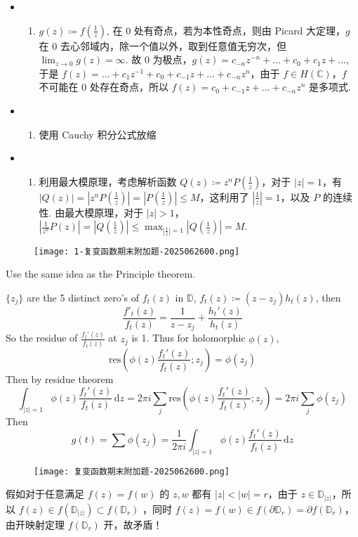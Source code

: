 \begin{itemize}
	\item 	\begin{enumerate}
		\item $g(z)\coloneqq f\left( \frac{1}{z} \right)$, 在 0 处有奇点，若为本性奇点，则由 Picard 大定理，$g$ 在 0 去心邻域内，除一个值以外，取到任意值无穷次，但 $\lim_{ z \to 0}g(z)=\infty$. 故 0 为极点，$g(z)=c_{-n}z^{-n}+\dots+c_0+c_1z+\dots$, 于是 $f(z)=\dots+c_1z^{-1}+c_0+c_{-1}z+\dots+c_{-n}z^{n}$，由于 $f\in H(\mathbb{C})$，$f$ 不可能在 0 处存在奇点，所以 $f(z)=c_0+c_{-1}z+\dots+c_{-n}z^{n}$ 是多项式.
	\end{enumerate}
	\item 	\begin{enumerate}
		\item 使用 Cauchy 积分公式放缩
	\end{enumerate}
	\item 	\begin{enumerate}
		\item 利用最大模原理，考虑解析函数 $Q (z)\coloneqq z^{n}P\left( \frac{1}{z} \right)$，对于 $\lvert z \rvert=1$，有 $\lvert Q(z) \rvert=\left\lvert  z^{n}P\left( \frac{1}{z} \right)  \right\rvert=\left\lvert  P\left( \frac{1}{z} \right)  \right\rvert\leq M$，这利用了 $\left\lvert  \frac{1}{z}  \right\rvert=1$，以及 $P$ 的连续性. 由最大模原理，对于 $\lvert z \rvert>1$，$\left\lvert  \frac{1}{z^{n}}P(z)  \right\rvert=\left\lvert  Q\left( \frac{1}{z} \right)  \right\rvert\leq \max_{\left\lvert  \frac{1}{z}  \right\rvert=1}\left\lvert  Q\left( \frac{1}{z} \right)  \right\rvert=M$.
	\end{enumerate}
\end{itemize}

\begin{figure}[H]
\centering
\texttt{[image: 1-复变函数期末附加题-2025062600.png]}
\label{}
\end{figure}

Use the same idea as the Principle theorem.

$\{ z_j \}$ are the 5 distinct zero's of $f_{t}(z)$ in $\mathbb{D}$, $f_{t}(z)\coloneqq(z-z_j)h_{t}(z)$, then
\[
\frac{f'_{t}(z)}{f_{t}(z)}=\frac{1}{z-z_j}+\frac{h_{t}'(z)}{h_{t}(z)}
\]
So the residue of $\frac{f_{t}'(z)}{f_{t}(z)}$ at $z_j$ is 1. Thus for holomorphic $\phi(z)$,
\[
\mathrm{res}\left( \phi(z)\frac{f_{t}'(z)}{f_{t}(z)} ;z_j\right)=\phi(z_j)
\]
Then by residue theorem
\[
\int_{\lvert z \rvert =1}^{} \phi(z)\frac{f_{t}'(z)}{f_{t}(z)} \, \mathrm{d}z=2\pi i\sum_{j}\mathrm{res} \left( \phi(z)\frac{f_{t}'(z)}{f_{t}(z)};z_j \right)=2\pi i \sum_{j}\phi(z_j)
\]
Then
\[
g(t)=\sum \phi(z_j)=\frac{1}{2\pi i}\int_{\lvert z \rvert =1}^{}\phi(z)\frac{f_{t}'(z)}{f_{t}(z)}  \, \mathrm{d}z 
\]
\begin{figure}[H]
\centering
\texttt{[image: 复变函数期末附加题-2025062600.png]}
\label{}
\end{figure}

假如对于任意满足 $f(z)=f(w)$ 的 $z,w$ 都有 $\lvert z \rvert<\lvert w \rvert=r$，由于 $z\in \mathbb{D}_{\lvert z \rvert}$，所以 $f (z)\in f(\mathbb{D}_{\lvert z \rvert})\subset f(\mathbb{D}_{r})$ ，同时 $f (z)=f (w)\in f(\partial \mathbb{D}_{r})=\partial f(\mathbb{D}_{r})$，由开映射定理 $f(\mathbb{D}_{r})$ 开，故矛盾！

